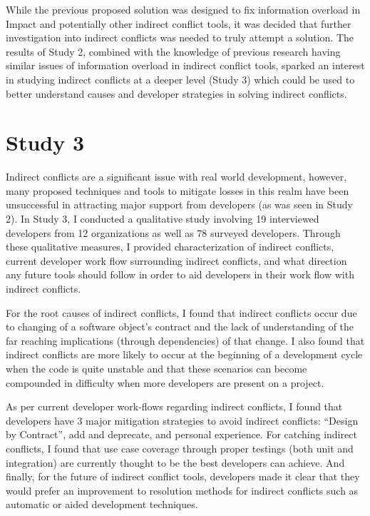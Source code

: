 While the previous proposed solution was designed to fix information overload in Impact and potentially other indirect
conflict tools, it was decided that further investigation into indirect conflicts was needed to truly attempt a solution.
The results of Study 2, combined with the knowledge of previous research having similar issues of information overload
in indirect conflict tools, sparked an interest in studying indirect conflicts at a deeper level (Study 3) which could
be used to better understand causes and developer strategies in solving indirect conflicts.

\section{Study 3}

Indirect conflicts are a significant issue with real world development, however, many proposed techniques and tools to mitigate
losses in this realm have been unsuccessful in attracting major support from developers (as was seen in Study 2). 
In Study 3, I conducted a qualitative study involving
19 interviewed developers from 12 organizations as well as 78 surveyed developers. Through these qualitative measures,
I provided characterization of indirect conflicts,
current developer work flow surrounding indirect conflicts, and what direction any future tools should follow in order to aid developers
in their work flow with indirect conflicts.

For the root causes of indirect conflicts, I found that indirect conflicts occur due to changing of a software object's 
contract and the lack of understanding of
the far reaching implications (through dependencies) of that change. I also found that indirect conflicts are more likely
to occur at the beginning of a development cycle when the code is quite unstable and that these scenarios can become
compounded in difficulty when more developers are present on a project. 

As per current developer work-flows regarding indirect conflicts, I found that developers have 3 major mitigation strategies
to avoid indirect conflicts: ``Design by Contract'', add and deprecate, and personal experience. For catching indirect conflicts,
I found that use case coverage through proper testings (both unit and integration) are currently thought to be the best
developers can achieve. And finally, for the future of indirect conflict tools, developers made it clear that they would
prefer an improvement to resolution methods for indirect conflicts such as automatic or aided development techniques.


